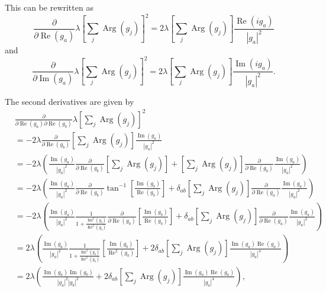 \documentclass{article}
\newcommand\re{\operatorname{Re}}
\newcommand\im{\operatorname{Im}}
\begin{document}
This can be rewritten as
\begin{equation}
\frac{\partial}{\partial \re(g_a)} \lambda \left[ \sum_j \operatorname{Arg}(g_j) \right]^2 = 2 \lambda \left[ \sum_j \operatorname{Arg}(g_j) \right] \frac{\re(i g_a)}{|g_a|^2}
\end{equation}
and
\begin{equation}
\frac{\partial}{\partial \im(g_a)} \lambda \left[ \sum_j \operatorname{Arg}(g_j) \right]^2 = 2 \lambda \left[ \sum_j \operatorname{Arg}(g_j) \right] \frac{\im(i g_a)}{|g_a|^2}.
\end{equation}

The second derivatives are given by
\begin{align}
    &\frac{\partial}
    {\partial \re(g_a) \partial \re(g_b)} \lambda \left[ \sum_j \operatorname{Arg}(g_j) \right]^2 \\
    &= -2 \lambda \frac{\partial}{\partial \re(g_b)} \left[ \sum_j \operatorname{Arg}(g_j) \right] \frac{\im(g_a)}{|g_a|^2} \\
    &= -2 \lambda \left( \frac{\im(g_a)}{|g_a|^2} \frac{\partial}{\partial \re(g_b)} \left[ \sum_j \operatorname{Arg}(g_j) \right] + \left[ \sum_j \operatorname{Arg}(g_j) \right] \frac{\partial}{\partial \re(g_b)} \frac{\im(g_a)}{|g_a|^2}  \right) \\
    &= -2 \lambda \left( \frac{\im(g_a)}{|g_a|^2} \frac{\partial}{\partial \re(g_b)} \tan^{-1} \left[ \frac{\im(g_b)}{\re(g_b)} \right] + \delta_{ab} \left[ \sum_j \operatorname{Arg}(g_j) \right] \frac{\partial}{\partial \re(g_a)} \frac{\im(g_a)}{|g_a|^2}  \right) \\
    &= -2 \lambda \left( \frac{\im(g_a)}{|g_a|^2} \frac{1}{1+\frac{\im^2(g_b)}{\re^2(g_b)}} \frac{\partial}
    {\partial \re(g_b)} \left[ \frac{\im(g_b)}{\re(g_b)} \right] + \delta_{ab} \left[ \sum_j \operatorname{Arg}(g_j) \right] \frac{\partial}{\partial \re(g_a)} \frac{\im(g_a)}{|g_a|^2}  \right) \\
    &= 2 \lambda \left( \frac{\im(g_a)}{|g_a|^2} \frac{1}{1+\frac{\im^2(g_b)}{\re^2(g_b)}} \left[ \frac{\im(g_b)}{\re^2(g_b)} \right] + 2 \delta_{ab} \left[ \sum_j \operatorname{Arg}(g_j) \right] \frac{\im(g_a) \re(g_a)}{|g_a|^4}  \right) \\
    &= 2 \lambda \left( \frac{\im(g_a) \im(g_b)}{|g_a|^2 |g_b|^2} + 2 \delta_{ab} \left[ \sum_j \operatorname{Arg}(g_j) \right] \frac{\im(g_a) \re(g_a)}{|g_a|^4}  \right), \\
\end{align}
\end{document}
